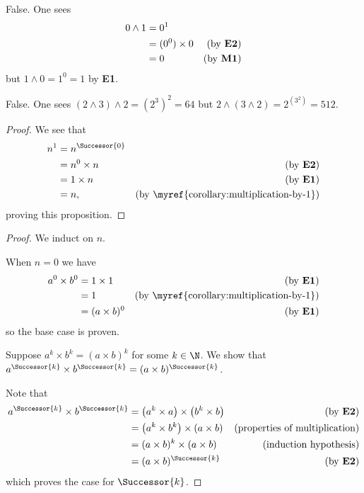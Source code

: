 \begin{questions}
    \item \begin{partquestions}{\alph*}
        \item False. One sees
        \begin{align*}
            0 \wedge 1 &= 0^1\\
            &= (0^0) \times 0 & (\text{by \textbf{E2}})\\
            &= 0 & (\text{by \textbf{M1}})
        \end{align*}
        but $1 \wedge 0 = 1^0 = 1$ by \textbf{E1}.
        \item False. One sees $(2\wedge 3)\wedge2 = \left(2^3\right)^2 = 64$ but $2\wedge (3\wedge 2) = 2^{\left(3^2\right)} = 512$.
    \end{partquestions}

    \item \begin{proof}
        We see that
        \begin{align*}
            n^1 &= n^\Successor{0}\\
            &= n^0 \times n & (\text{by \textbf{E2}})\\
            &= 1 \times n & (\text{by \textbf{E1}})\\
            &= n, & (\text{by \myref{corollary:multiplication-by-1}})
        \end{align*}
        proving this proposition.
    \end{proof}

    \item \begin{proof}
        We induct on $n$.

        When $n = 0$ we have
        \begin{align*}
            a^0 \times b^0 &= 1 \times 1 & (\text{by \textbf{E1}})\\
            &= 1 & (\text{by \myref{corollary:multiplication-by-1}})\\
            &= (a\times b)^0 & (\text{by \textbf{E1}})
        \end{align*}
        so the base case is proven.

        Suppose $a^k \times b^k = (a\times b)^k$ for some $k \in \N$. We show that $a^\Successor{k} \times b^\Successor{k} = (a\times b)^\Successor{k}$.

        Note that
        \begin{align*}
            a^\Successor{k} \times b^\Successor{k} &= \left(a^k \times a\right) \times \left(b^k \times b\right) & (\text{by \textbf{E2}})\\
            &= \left(a^k \times b^k\right) \times (a \times b) & (\text{properties of multiplication})\\
            &= (a\times b)^k \times (a \times b) & (\text{induction hypothesis})\\
            &= (a\times b)^\Successor{k} & (\text{by \textbf{E2}})
        \end{align*}
        which proves the case for $\Successor{k}$.
    \end{proof}
\end{questions}
